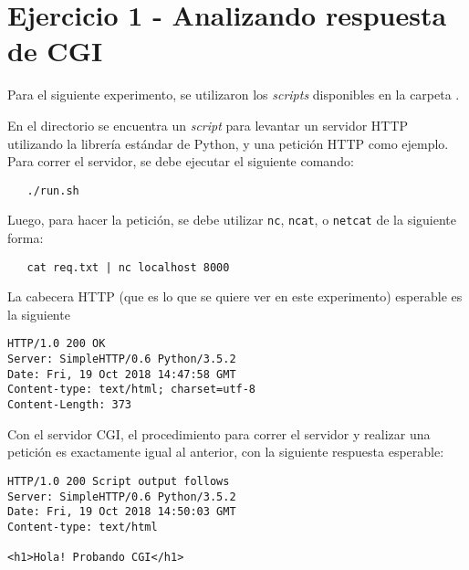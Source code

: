 






\clearpage
\tableofcontents
\clearpage 

\lstset{style=MyStyle}

\section{Ejercicio 1 - Analizando respuesta de CGI}

Para el siguiente experimento, se utilizaron los \emph{scripts} disponibles en la carpeta . 

En el directorio  se encuentra un \emph{script} para levantar un servidor HTTP utilizando la librería estándar de Python, y una petición HTTP como ejemplo. Para correr el servidor, se debe ejecutar el siguiente comando:

\begin{lstlisting}
   ./run.sh 
\end{lstlisting}

Luego, para hacer la petición, se debe utilizar \texttt{nc}, \texttt{ncat}, o \texttt{netcat} de la siguiente forma:

\begin{lstlisting}
   cat req.txt | nc localhost 8000 
\end{lstlisting}

La cabecera HTTP (que es lo que se quiere ver en este experimento) esperable es la siguiente

\begin{lstlisting}
HTTP/1.0 200 OK
Server: SimpleHTTP/0.6 Python/3.5.2
Date: Fri, 19 Oct 2018 14:47:58 GMT
Content-type: text/html; charset=utf-8
Content-Length: 373
\end{lstlisting}

Con el servidor CGI, el procedimiento para correr el servidor y realizar una petición es exactamente igual al anterior, con la siguiente respuesta esperable:

\begin{lstlisting}
HTTP/1.0 200 Script output follows
Server: SimpleHTTP/0.6 Python/3.5.2
Date: Fri, 19 Oct 2018 14:50:03 GMT
Content-type: text/html

<h1>Hola! Probando CGI</h1>
\end{lstlisting}



\clearpage
\printbibliography


